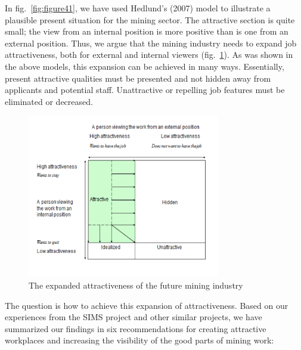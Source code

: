\documentclass[
  12pt,
]{scrbook}
\begin{document}
In fig.~\ref{fig:figure41}, we have used Hedlund's (2007) model to illustrate a plausible present situation for the mining sector. The attractive section is quite small; the view from an internal position is more positive than is one from an external position. Thus, we argue that the mining industry needs to expand job attractiveness, both for external and internal viewers (fig.~\ref{fig:figure42}). As was shown in the above models, this expansion can be achieved in many ways. Essentially, present attractive qualities must be presented and not hidden away from applicants and potential staff. Unattractive or repelling job features must be eliminated or decreased.

\begin{figure}
\hypertarget{fig:figure42}{%
\centering
\includegraphics[width=0.75\textwidth,height=\textheight]{./media/04-attracting-young-people-to-the-mining-industry/media/image2.png}
\caption{The expanded attractiveness of the future mining industry}\label{fig:figure42}
}
\end{figure}

The question is how to achieve this expansion of attractiveness. Based on our experiences from the SIMS project and other similar projects, we have summarized our findings in six recommendations for creating attractive workplaces and increasing the visibility of the good parts of mining work:
\end{document}
